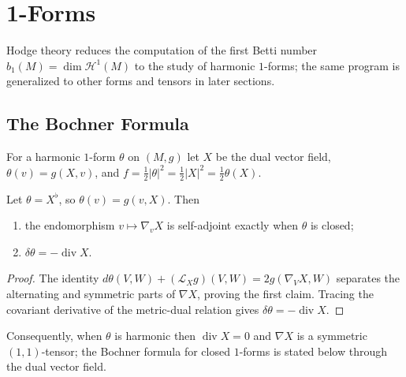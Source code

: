 \section{1-Forms}

Hodge theory reduces the computation of the first Betti number
$b_1(M)=\dim\mathcal{H}^1(M)$ to the study of harmonic $1$-forms; the same
program is generalized to other forms and tensors in later sections.

\subsection{The Bochner Formula}

For a harmonic $1$-form $\theta$ on $(M,g)$ let $X$ be the dual vector field,
$\theta(v)=g(X,v)$, and $f=\tfrac12|\theta|^2=\tfrac12|X|^2=\tfrac12\theta(X)$.

\begin{proposition}
  \label{prop:pet-ch9-vector-field-1form-duality}
  Let $\theta=X^\flat$, so $\theta(v)=g(v,X)$.  Then
  \begin{enumerate}
    \item the endomorphism $v\mapsto\nabla_vX$ is self-adjoint exactly when
      $\theta$ is closed;
    \item $\delta\theta=-\operatorname{div}X$.
  \end{enumerate}
\end{proposition}
\begin{proof}
  \sketch
  The identity
  \(d\theta(V,W)+(\mathcal L_Xg)(V,W)=2g(\nabla_VX,W)\) separates the
  alternating and symmetric parts of \(\nabla X\), proving the first claim.
  Tracing the covariant derivative of the metric-dual relation gives
  \(\delta\theta=-\operatorname{div}X\).
\end{proof}

Consequently, when $\theta$ is harmonic then $\operatorname{div}X=0$ and $\nabla X$ is a
symmetric $(1,1)$-tensor; the Bochner formula for closed $1$-forms is stated
below through the dual vector field.

